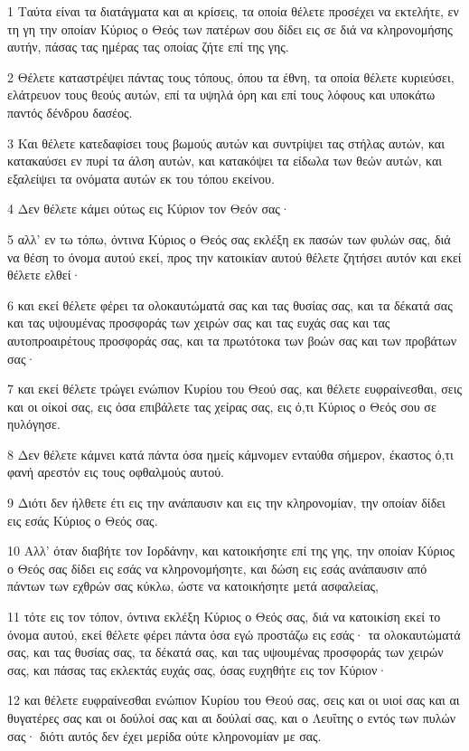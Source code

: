 \par 1 Ταύτα είναι τα διατάγματα και αι κρίσεις, τα οποία θέλετε προσέχει να εκτελήτε, εν τη γη την οποίαν Κύριος ο Θεός των πατέρων σου δίδει εις σε διά να κληρονομήσης αυτήν, πάσας τας ημέρας τας οποίας ζήτε επί της γης.
\par 2 Θέλετε καταστρέψει πάντας τους τόπους, όπου τα έθνη, τα οποία θέλετε κυριεύσει, ελάτρευον τους θεούς αυτών, επί τα υψηλά όρη και επί τους λόφους και υποκάτω παντός δένδρου δασέος.
\par 3 Και θέλετε κατεδαφίσει τους βωμούς αυτών και συντρίψει τας στήλας αυτών, και κατακαύσει εν πυρί τα άλση αυτών, και κατακόψει τα είδωλα των θεών αυτών, και εξαλείψει τα ονόματα αυτών εκ του τόπου εκείνου.
\par 4 Δεν θέλετε κάμει ούτως εις Κύριον τον Θεόν σας·
\par 5 αλλ' εν τω τόπω, όντινα Κύριος ο Θεός σας εκλέξη εκ πασών των φυλών σας, διά να θέση το όνομα αυτού εκεί, προς την κατοικίαν αυτού θέλετε ζητήσει αυτόν και εκεί θέλετε ελθεί·
\par 6 και εκεί θέλετε φέρει τα ολοκαυτώματά σας και τας θυσίας σας, και τα δέκατά σας και τας υψουμένας προσφοράς των χειρών σας και τας ευχάς σας και τας αυτοπροαιρέτους προσφοράς σας, και τα πρωτότοκα των βοών σας και των προβάτων σας·
\par 7 και εκεί θέλετε τρώγει ενώπιον Κυρίου του Θεού σας, και θέλετε ευφραίνεσθαι, σεις και οι οίκοί σας, εις όσα επιβάλετε τας χείρας σας, εις ό,τι Κύριος ο Θεός σου σε ηυλόγησε.
\par 8 Δεν θέλετε κάμνει κατά πάντα όσα ημείς κάμνομεν ενταύθα σήμερον, έκαστος ό,τι φανή αρεστόν εις τους οφθαλμούς αυτού.
\par 9 Διότι δεν ήλθετε έτι εις την ανάπαυσιν και εις την κληρονομίαν, την οποίαν δίδει εις εσάς Κύριος ο Θεός σας.
\par 10 Αλλ' όταν διαβήτε τον Ιορδάνην, και κατοικήσητε επί της γης, την οποίαν Κύριος ο Θεός σας δίδει εις εσάς να κληρονομήσητε, και δώση εις εσάς ανάπαυσιν από πάντων των εχθρών σας κύκλω, ώστε να κατοικήσητε μετά ασφαλείας,
\par 11 τότε εις τον τόπον, όντινα εκλέξη Κύριος ο Θεός σας, διά να κατοικίση εκεί το όνομα αυτού, εκεί θέλετε φέρει πάντα όσα εγώ προστάζω εις εσάς· τα ολοκαυτώματά σας, και τας θυσίας σας, τα δέκατά σας, και τας υψουμένας προσφοράς των χειρών σας, και πάσας τας εκλεκτάς ευχάς σας, όσας ευχηθήτε εις τον Κύριον·
\par 12 και θέλετε ευφραίνεσθαι ενώπιον Κυρίου του Θεού σας, σεις και οι υιοί σας και αι θυγατέρες σας και οι δούλοί σας και αι δούλαί σας, και ο Λευΐτης ο εντός των πυλών σας· διότι αυτός δεν έχει μερίδα ούτε κληρονομίαν με σας.
